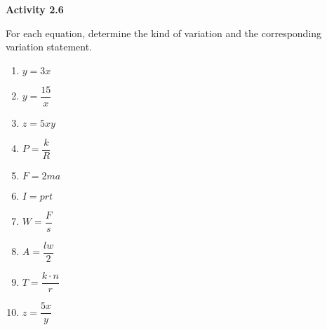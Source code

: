 \vspace{0.3ex}
\noindent\textbf{Activity 2.6}

\vspace{0.2ex}

 For each equation, determine the kind of variation and the corresponding variation statement.
\begin{multicols}{3}
\begin{enumerate}[noitemsep, label = \color{blue}\arabic*. ]
    \item $y = 3x$
    
    \item $y = \dfrac{15}{x}$
    
    \item $z = 5xy$
    
    \item $P = \dfrac{k}{R}$
    
    \item $F = 2ma$
    
    \item $I = prt$
    
    \item $W = \dfrac{F}{s}$
    
    \item $A = \dfrac{lw}{2}$
    
    \item $T = \dfrac{k \cdot n}{r}$
    
    \item $z = \dfrac{5x}{y}$
\end{enumerate}
\end{multicols}


